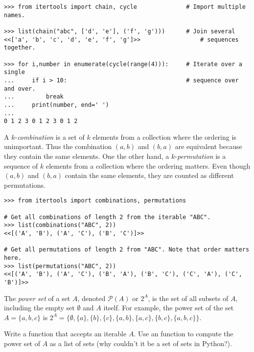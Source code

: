 \begin{lstlisting}
>>> from itertools import chain, cycle              # Import multiple names.

>>> list(chain("abc", ['d', 'e'], ('f', 'g')))      # Join several
<<['a', 'b', 'c', 'd', 'e', 'f', 'g']>>                 # sequences together.

>>> for i,number in enumerate(cycle(range(4))):     # Iterate over a single
...     if i > 10:                                  # sequence over and over.
...         break
...     print(number, end=' ')
...
0 1 2 3 0 1 2 3 0 1 2
\end{lstlisting}

A $k$-\emph{combination} is a set of $k$ elements from a collection where the ordering is unimportant.
Thus the combination $(a,b)$ and $(b,a)$ are equivalent because they contain the same elements.
One the other hand, a $k$-\emph{permutation} is a sequence of $k$ elements from a collection where the ordering matters.
Even though $(a,b)$ and $(b,a)$ contain the same elements, they are counted as different permutations.

\begin{lstlisting}
>>> from itertools import combinations, permutations

# Get all combinations of length 2 from the iterable "ABC".
>>> list(combinations("ABC", 2))
<<[('A', 'B'), ('A', 'C'), ('B', 'C')]>>

# Get all permutations of length 2 from "ABC". Note that order matters here.
>>> list(permutations("ABC", 2))
<<[('A', 'B'), ('A', 'C'), ('B', 'A'), ('B', 'C'), ('C', 'A'), ('C', 'B')]>>
\end{lstlisting}

\begin{problem}
The \emph{power set} of a set $A$, denoted $\mathcal{P}(A)$ or $2^A$, is the set of all subsets of $A$, including the empty set $\emptyset$ and $A$ itself.
For example, the power set of the set $A = \{a, b, c\}$ is $2^A = \{\emptyset, \{a\}, \{b\}, \{c\}, \{a,b\}, \{a,c\}, \{b,c\}, \{a,b,c\}\}$.

Write a function that accepts an iterable $A$.
Use an  function to compute the power set of $A$ as a list of sets (why couldn't it be a set of sets in Python?).
\end{problem}

\newpage

